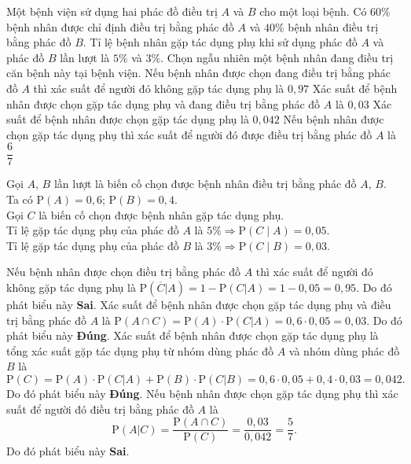 \begin{ex}%
	Một bệnh viện sử dụng hai phác đồ điều trị $A$ và $B$ cho một loại bệnh. Có $60\%$ bệnh nhân được chỉ định điều trị bằng phác đồ $A$ và $40\%$ bệnh nhân điều trị bằng phác đồ $B$. Tỉ lệ bệnh nhân gặp tác dụng phụ khi sử dụng phác đồ $A$ và phác đồ $B$ lần lượt là $5\%$ và $3\%$. Chọn ngẫu nhiên một bệnh nhân đang điều trị căn bệnh này tại bệnh viện.
	\choiceTF
	{Nếu bệnh nhân được chọn đang điều trị bằng phác đồ $A$ thì xác suất để người đó không gặp tác dụng phụ là $0{,}97$}
	{\True Xác suất để bệnh nhân được chọn gặp tác dụng phụ và đang điều trị bằng phác đồ $A$ là $0{,}03$}
	{\True Xác suất để bệnh nhân được chọn gặp tác dụng phụ là $0{,}042$}
	{Nếu bệnh nhân được chọn gặp tác dụng phụ thì xác suất để người đó được điều trị bằng phác đồ $A$ là $\dfrac{6}{7}$}
	\loigiai
	{Gọi $A$, $B$ lần lượt là biến cố chọn được bệnh nhân điều trị bằng phác đồ $A$, $B$.\\
		Ta có $\mathrm{P}(A)=0{,}6$; $\mathrm{P}(B)=0{,}4$.\\
		Gọi $C$ là biến cố chọn được bệnh nhân gặp tác dụng phụ.\\
		Tỉ lệ gặp tác dụng phụ của phác đồ $A$ là $5 \% \Rightarrow \mathrm{P}(C \mid A)=0{,}05$.\\
		Tỉ lệ gặp tác dụng phụ của phác đồ $B$ là $3 \% \Rightarrow \mathrm{P}(C \mid B)=0{,}03$.
		\begin{itemchoice}
			\itemch Nếu bệnh nhân được chọn điều trị bằng phác đồ $A$ thì xác suất để người đó không gặp tác dụng phụ là $\mathrm{P}(\overline{C}\left| A\right.)=1-\mathrm{P}(C\left| A\right.)=1-0{,}05=0{,}95$. Do đó phát biểu này \textbf{Sai}.
			\itemch Xác suất để bệnh nhân được chọn gặp tác dụng phụ và điều trị bằng phác đồ $A$ là $\mathrm{P}(A\cap C)=\mathrm{P}(A)\cdot \mathrm{P}(C\left| A\right.)=0{,}6\cdot 0{,}05=0{,}03$. Do đó phát biểu này \textbf{Đúng}.
			\itemch Xác suất để bệnh nhân được chọn gặp tác dụng phụ là tổng xác suất gặp tác dụng phụ từ nhóm dùng phác đồ $A$ và nhóm dùng phác đồ $B$ là
			$$\mathrm{P}(C)=\mathrm{P}(A)\cdot \mathrm{P}(C\left| A\right.)+\mathrm{P}(B)\cdot \mathrm{P}(C\left| B\right.)=0{,}6\cdot 0{,}05+0{,}4\cdot 0{,}03=0{,}042.$$
			Do đó phát biểu này \textbf{Đúng}.
			\itemch Nếu bệnh nhân được chọn gặp tác dụng phụ thì xác suất để người đó điều trị bằng phác đồ $A$ là $$\mathrm{P}(A\left| C\right.)=\dfrac{\mathrm{P}(A\cap C)}{\mathrm{P}(C)}=\dfrac{0{,}03}{0{,}042}=\dfrac{5}{7}.$$
			Do đó phát biểu này \textbf{Sai}.
		\end{itemchoice}
	}
\end{ex}

